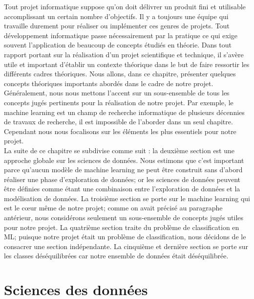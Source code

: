 \documentclass[12pt, french]{report}
\begin{document}
Tout projet informatique suppose qu'on doit délivrer un produit fini et utilisable accomplissant un certain nombre d'objectifs. Il y a toujours une équipe qui travaille durement pour réaliser ou implémenter ces genres de projets. Tout développement informatique passe nécessairement par la pratique ce qui exige souvent l'application de beaucoup de concepts étudiés en théorie. Dans tout rapport portant sur la réalisation d'un projet scientifique et technique, il s'avère utile et important d'établir un contexte théorique dans le but de faire ressortir les différents cadres théoriques. Nous allons, dans ce chapitre, présenter quelques concepts théoriques importants abordés dans le cadre de notre projet.\\

Généralement, nous nous mettons l'accent sur un sous-ensemble de tous les concepts jugés pertinents pour la réalisation de notre projet. Par exemple, le machine learning est un champ de recherche informatique de plusieurs décennies de travaux de recherche, il est impossible de l'aborder dans un seul chapitre. Cependant nous nous focalisons sur les éléments les plus essentiels pour notre projet. \\      

La suite de ce chapitre se subdivise comme suit : la deuxième section est une approche globale sur les sciences de données. Nous estimons que c'est important parce qu'aucun modèle de machine learning ne peut être construit sans d'abord réaliser une phase d'exploration de données; or les sciences de données peuvent être définies comme étant une combinaison entre l'exploration de données et la modélisation de données. La troisième section se porte sur le machine learning qui est le cœur même de notre projet; comme on avait précisé au paragraphe antérieur, nous considérons seulement un sous-ensemble de concepts jugés utiles pour notre projet. La quatrième section traite du problème de classification en ML; puisque notre projet était un problème de classification, nous décidons de le consacrer une section indépendante. La cinquième et dernière section se porte sur les classes déséquilibrées car notre ensemble de données était déséquilibrée.     

\section{Sciences des données} \label{datascience}
\end{document}
